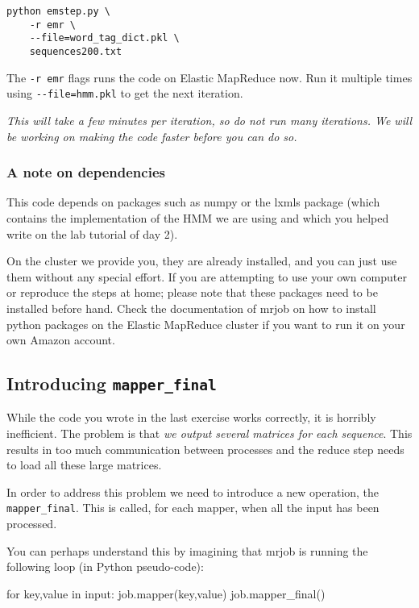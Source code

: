 \begin{verbatim}
python emstep.py \
    -r emr \
    --file=word_tag_dict.pkl \
    sequences200.txt
\end{verbatim}

The \verb+-r emr+ flags runs the code on Elastic MapReduce now. Run it multiple
times using \verb+--file=hmm.pkl+ to get the next iteration.

\emph{This will take a few minutes per iteration, so do not run many
iterations. We will be working on making the code faster before you can do
so.}

\subsubsection{A note on dependencies}

This code depends on packages such as numpy or the lxmls package (which
contains the implementation of the HMM we are using and which you helped write
on the lab tutorial of day 2).

On the cluster we provide you, they are already installed, and you can just use
them without any special effort. If you are attempting to use your own computer
or reproduce the steps at home; please note that these packages need to be
installed before hand. Check the documentation of mrjob on how to install
python packages on the Elastic MapReduce cluster if you want to run it on your
own Amazon account.

\subsection{Introducing \texttt{mapper\_final}}

While the code you wrote in the last exercise works correctly, it is horribly
inefficient. The problem is that \emph{we output several matrices for each
sequence}. This results in too much communication between processes and the
reduce step needs to load all these large matrices.

In order to address this problem we need to introduce a new operation, the
\verb+mapper_final+. This is called, for each mapper, when all the input has been
processed.

You can perhaps understand this by imagining that mrjob is running the
following loop (in Python pseudo-code):

\begin{python}
for key,value in input:
    job.mapper(key,value)
job.mapper_final()
\end{python}


